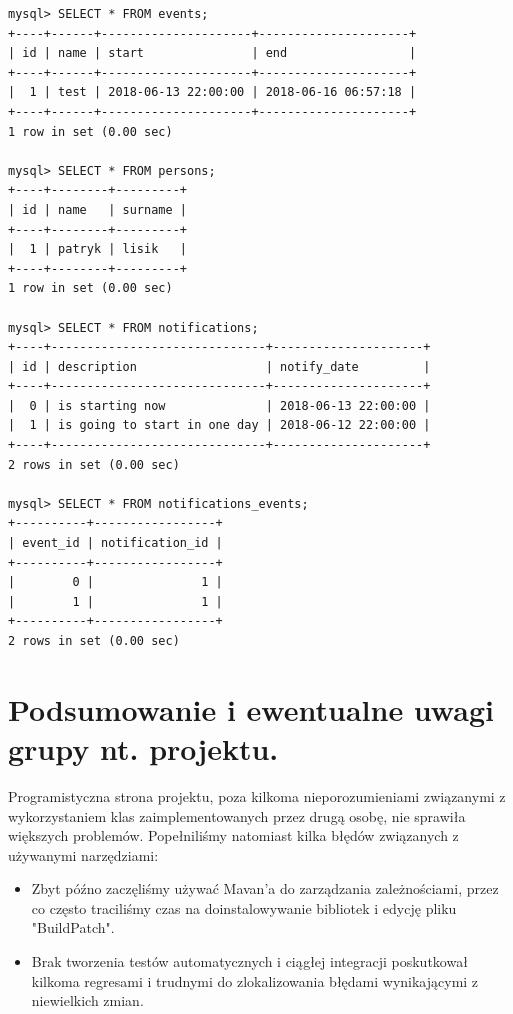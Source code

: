 \documentclass[a4paper,12pt]{article}
\begin{document}
\begin{lstlisting}[style=DOS]
mysql> SELECT * FROM events;
+----+------+---------------------+---------------------+
| id | name | start               | end                 |
+----+------+---------------------+---------------------+
|  1 | test | 2018-06-13 22:00:00 | 2018-06-16 06:57:18 |
+----+------+---------------------+---------------------+
1 row in set (0.00 sec)

mysql> SELECT * FROM persons;
+----+--------+---------+
| id | name   | surname |
+----+--------+---------+
|  1 | patryk | lisik   |
+----+--------+---------+
1 row in set (0.00 sec)

mysql> SELECT * FROM notifications;
+----+------------------------------+---------------------+
| id | description                  | notify_date         |
+----+------------------------------+---------------------+
|  0 | is starting now              | 2018-06-13 22:00:00 |
|  1 | is going to start in one day | 2018-06-12 22:00:00 |
+----+------------------------------+---------------------+
2 rows in set (0.00 sec)

mysql> SELECT * FROM notifications_events;
+----------+-----------------+
| event_id | notification_id |
+----------+-----------------+
|        0 |               1 |
|        1 |               1 |
+----------+-----------------+
2 rows in set (0.00 sec)
\end{lstlisting}
\section{Podsumowanie i ewentualne uwagi grupy nt. projektu. }

Programistyczna strona projektu, poza kilkoma nieporozumieniami związanymi z wykorzystaniem klas zaimplementowanych przez drugą osobę, nie sprawiła większych problemów. Popełniliśmy natomiast kilka błędów związanych z używanymi narzędziami:
\begin{itemize}
\item Zbyt późno zaczęliśmy używać Mavan'a do zarządzania zależnościami, przez co często traciliśmy czas na doinstalowywanie bibliotek i edycję pliku "BuildPatch".

\item Brak tworzenia testów automatycznych i ciągłej integracji poskutkował kilkoma regresami i trudnymi do zlokalizowania błędami wynikającymi z niewielkich zmian. 
\end{itemize}
\end{document}
